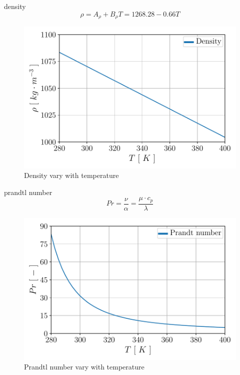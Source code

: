 \documentclass[12pt,oneside]{jbook}
\begin{document}
density
\begin{equation}
	\rho = A_{\rho}+B_{\rho} T = 1268.28 -0.66T
	\label{rho}
\end{equation}
\begin{figure}[ht]
    \vspace{0zh}
	\begin{center}
		\includegraphics[width=0.65\linewidth]{fig/mp_rho.pdf}
		\vspace{-1zh}
		\caption{Density vary with temperature}
		\label{rho}
	\end{center}
	\vspace{0zh}
\end{figure}


prandtl number
\begin{equation}
	Pr = \frac{\nu}{\alpha}= \frac{\mu \cdot c_{p}}{\lambda}
	\label{pr}
\end{equation}
\begin{figure}[ht]
	\vspace{0zh}
	\begin{center}
		\includegraphics[width=0.65\linewidth]{fig/mp_pr.pdf}
		\vspace{-1zh}
		\caption{Prandtl number vary with temperature}
		\label{pr}
	\end{center}
	\vspace{0zh}
\end{figure}
\end{document}
